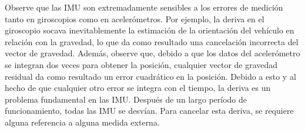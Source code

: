 \begin{frame}
{    Observe que las IMU son extremadamente sensibles a los errores de medición tanto en giroscopios como en acelerómetros. Por ejemplo, la deriva en el giroscopio socava inevitablemente la estimación de la orientación del vehículo en relación con la gravedad, lo que da como resultado una cancelación incorrecta del vector de gravedad. Además, observe que, debido a que los datos del acelerómetro se integran dos veces para obtener la posición, cualquier vector de gravedad residual da como resultado un error cuadrático en la posición. Debido a esto y al hecho de que cualquier otro error se integra con el tiempo, la deriva es un problema fundamental en las IMU. Después de un largo período de funcionamiento, todas las IMU se desvían. Para cancelar esta deriva, se requiere alguna referencia a alguna medida externa.
    }
\end{frame}

